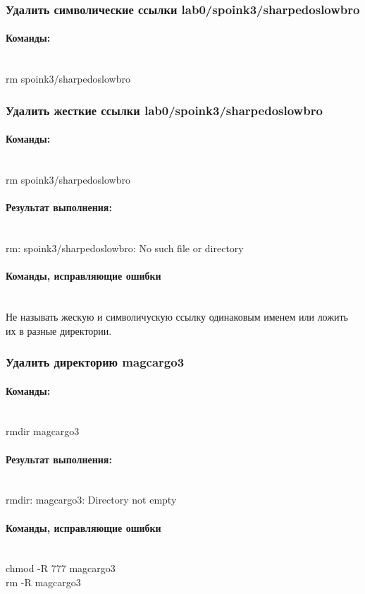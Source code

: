 \documentclass[12pt,onecolumn]{article}
\begin{document}
\subsubsection{Удалить символические ссылки lab0/spoink3/sharpedoslowbro}

\paragraph{Команды:}
\hfill\\
rm spoink3/sharpedoslowbro

\subsubsection{Удалить жесткие ссылки lab0/spoink3/sharpedoslowbro}
\paragraph{Команды:}
\hfill\\
rm spoink3/sharpedoslowbro
\paragraph{Результат выполнения: }
\hfill\\
rm: spoink3/sharpedoslowbro: No such file or directory
\paragraph{Команды, исправляющие ошибки}
\hfill\\
Не называть жескую и символичускую ссылку одинаковым именем или ложить их в разные директории.
\subsubsection{Удалить директорию magcargo3}
\paragraph{Команды:}
\hfill\\
rmdir magcargo3
\paragraph{Результат выполнения: }
\hfill\\
rmdir: magcargo3: Directory not empty
\paragraph{Команды, исправляющие ошибки}
\hfill\\
chmod -R 777 magcargo3\\
rm -R magcargo3\\
\end{document}
